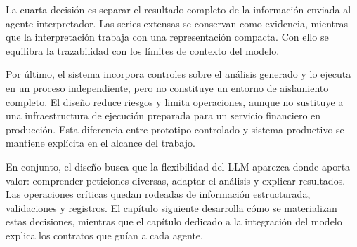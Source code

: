 La cuarta decisión es separar el resultado completo de la información enviada al agente interpretador. Las series extensas se conservan como evidencia, mientras que la interpretación trabaja con una representación compacta. Con ello se equilibra la trazabilidad con los límites de contexto del modelo.

Por último, el sistema incorpora controles sobre el análisis generado y lo ejecuta en un proceso independiente, pero no constituye un entorno de aislamiento completo. El diseño reduce riesgos y limita operaciones, aunque no sustituye a una infraestructura de ejecución preparada para un servicio financiero en producción. Esta diferencia entre prototipo controlado y sistema productivo se mantiene explícita en el alcance del trabajo.

En conjunto, el diseño busca que la flexibilidad del LLM aparezca donde aporta valor: comprender peticiones diversas, adaptar el análisis y explicar resultados. Las operaciones críticas quedan rodeadas de información estructurada, validaciones y registros. El capítulo siguiente desarrolla cómo se materializan estas decisiones, mientras que el capítulo dedicado a la integración del modelo explica los contratos que guían a cada agente.
